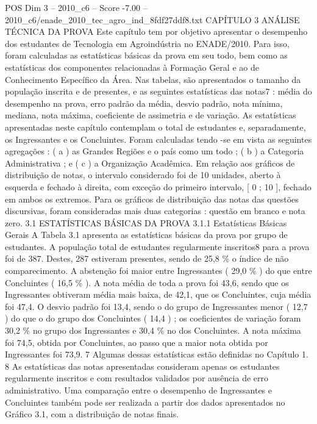 \begin{textsample}{POS Dim 3 – 2010\_c6 – Score -7.00 – 2010\_c6/enade\_2010\_tec\_agro\_ind\_8fdf27ddf8.txt}  \label{ex:f3_pos_272}
CAPÍTULO 3 ANÁLISE TÉCNICA DA PROVA Este capítulo tem por objetivo apresentar o desempenho dos estudantes de Tecnologia em Agroindústria no ENADE/2010.
Para isso, foram calculadas as estatísticas básicas da prova em seu todo, bem como as estatísticas dos componentes relacionadas à Formação Geral e ao de Conhecimento Específico da Área.
Nas tabelas, são apresentados o tamanho da população inscrita e de presentes, e as seguintes estatísticas das notas7 : média do desempenho na prova, erro padrão da média, desvio padrão, nota mínima, mediana, nota máxima, coeficiente de assimetria e de variação.
As estatísticas apresentadas neste capítulo contemplam o total de estudantes e, separadamente, os Ingressantes e os Concluintes.
Foram calculadas tendo -se em vista as seguintes agregações : ( a ) as Grandes Regiões e o país como um todo ; ( b ) a Categoria Administrativa ; e ( c ) a Organização Acadêmica.
Em relação aos gráficos de distribuição de notas, o intervalo considerado foi de 10 unidades, aberto à esquerda e fechado à direita, com exceção do primeiro intervalo, [ 0 ; 10 ], fechado em ambos os extremos.
Para os gráficos de distribuição das notas das questões discursivas, foram consideradas mais duas categorias : questão em branco e nota zero. 3.1 ESTATÍSTICAS BÁSICAS DA PROVA 3.1.1 Estatísticas Básicas Gerais A Tabela 3.1 apresenta as estatísticas básicas da prova por grupo de estudantes.
A população total de estudantes regularmente inscritos8 para a prova foi de 387.
Destes, 287 estiveram presentes, sendo de 25,8 \% o índice de não comparecimento.
A abstenção foi maior entre Ingressantes ( 29,0 \% ) do que entre Concluintes ( 16,5 \% ).
A nota média de toda a prova foi 43,6, sendo que os Ingressantes obtiveram média mais baixa, de 42,1, que os Concluintes, cuja média foi 47,4.
O desvio padrão foi 13,4, sendo o do grupo de Ingressantes menor ( 12,7 ) do que o do grupo dos Concluintes ( 14,4 ) ; os coeficientes de variação foram 30,2 \% no grupo dos Ingressantes e 30,4 \% no dos Concluintes.
A nota máxima foi 74,5, obtida por Concluintes, ao passo que a maior nota obtida por Ingressantes foi 73,9. 7 Algumas dessas estatísticas estão definidas no Capítulo 1. 8 As estatísticas das notas apresentadas consideram apenas os estudantes regularmente inscritos e com resultados validados por ausência de erro administrativo.
Uma comparação entre o desempenho de Ingressantes e Concluintes também pode ser realizada a partir dos dados apresentados no Gráfico 3.1, com a distribuição de notas finais.

\end{textsample}
